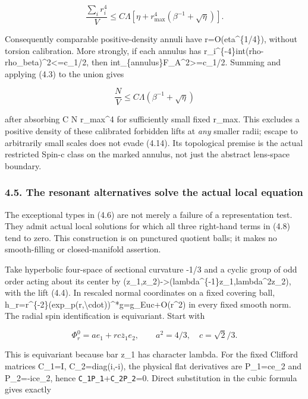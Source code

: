 \documentclass[
  10pt,
]{article}
\begin{document}
\[
 \frac{\sum_i r_i^4}V\le C\Lambda
            [\eta+r_{\max}^4(\beta^{-1}+\sqrt\eta)]. \tag{4.13}
\]

Consequently comparable positive-density annuli have
r=O(eta\^{}\{1/4\}), without torsion calibration. More strongly, if each
annulus has r\_i\^{}\{-4\}int(rho-rho\_beta)\^{}2\textless=c\_1/2, then
int\_\{annulus\}\textbar F\_A\textbar\^{}2\textgreater=c\_1/2. Summing
and applying (4.3) to the union gives

\[
 \boxed{\frac NV\le C\Lambda(\beta^{-1}+\sqrt\eta)}  \tag{4.14}
\]

after absorbing C N r\_max\^{}4 for sufficiently small fixed r\_max.
This excludes a positive density of these calibrated forbidden lifts at
\emph{any} smaller radii; escape to arbitrarily small scales does not
evade (4.14). Its topological premise is the actual restricted Spin-c
class on the marked annulus, not just the abstract lens-space boundary.

\hypertarget{the-resonant-alternatives-solve-the-actual-local-equation}{%
\subsubsection{4.5. The resonant alternatives solve the actual local
equation}\label{the-resonant-alternatives-solve-the-actual-local-equation}}

The exceptional types in (4.6) are not merely a failure of a
representation test. They admit actual local solutions for which all
three right-hand terms in (4.8) tend to zero. This construction is on
punctured quotient balls; it makes no smooth-filling or closed-manifold
assertion.

Take hyperbolic four-space of sectional curvature -1/3 and a cyclic
group of odd order acting about its center by
(z\_1,z\_2)-\textgreater(lambda\^{}\{-1\}z\_1,lambda\^{}2z\_2), with the
lift (4.4). In rescaled normal coordinates on a fixed covering ball,
h\_r=r\^{}\{-2\}(exp\_p(r,\textbackslash cdot))\^{}*g=g\_Euc+O(r\^{}2)
in every fixed smooth norm. The radial spin identification is
equivariant. Start with

\[
 \Phi_r^0=a e_1+r c\overline z_1e_2,\qquad
 a^2=4/3,\quad c=\sqrt2/3.                          \tag{4.15}
\]

This is equivariant because bar z\_1 has character lambda. For the fixed
Clifford matrices C\_1=I, C\_2=diag(i,-i), the physical flat derivatives
are P\_1=ce\_2 and P\_2=-ice\_2, hence \nolinkurl{C_1P_1}+\nolinkurl{C_2P_2}=0. Direct
substitution in the cubic formula gives exactly
\end{document}
